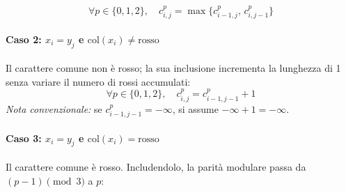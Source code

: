 $$\forall p \in \{0, 1, 2\}, \quad c_{i,j}^p = \max \{ c_{i-1,j}^p, \, c_{i,j-1}^p \}$$\paragraph{Caso 2: $x_i = y_j$ e $\text{col}(x_i) \neq \text{rosso}$}
Il carattere comune non è rosso; la sua inclusione incrementa la lunghezza di 1 senza variare il numero di rossi accumulati:
$$\forall p \in \{0, 1, 2\}, \quad c_{i,j}^p = c_{i-1,j-1}^p + 1$$
\textit{Nota convenzionale:} se $c_{i-1,j-1}^p = -\infty$, si assume $-\infty + 1 = -\infty$.\paragraph{Caso 3: $x_i = y_j$ e $\text{col}(x_i) = \text{rosso}$}
Il carattere comune è rosso. Includendolo, la parità modulare passa da $(p - 1) \pmod 3$ a $p$:
